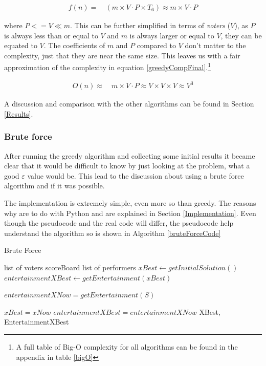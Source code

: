 \documentclass[12pt]{report}
\begin{document}
\begin{equation}\label{greedyCompSimp}
\begin{aligned}
	f(n) ={} & \ (m \times V \cdot P \times T_6) \approx m \times V \cdot P
\end{aligned}
\end{equation}

where $P <= V \ll m$. This can be further simplified in terms of \textit{voters} ($V$), as $P$ is always less than or equal to $V$ and $m$ is always larger or equal to $V$, they can be equated to $V$. The coefficients of $m$ and $P$ compared to $V$ don't matter to the complexity, just that they are near the same size. This leaves us with a fair approximation of the complexity in equation \ref{greedyCompFinal}.\footnote{A full table of Big-O complexity for all algorithms can be found in the appendix in table \ref{bigO}}

\begin{equation}\label{greedyCompFinal}
\begin{aligned}
	O(n) \approx{} & \ m \times V \cdot P \approx V \times V \times V \approx V^3
\end{aligned}
\end{equation}

A discussion and comparison with the other algorithms can be found in Section \ref{Results}.

\subsubsection{Brute force}
After running the greedy algorithm and collecting some initial results it became clear that it would be difficult to know by just looking at the problem, what a good $\varepsilon$ value would be. This lead to the discussion about using a brute force algorithm and if it was possible. 

The implementation is extremely simple, even more so than greedy. The reasons why are to do with Python and are explained in Section \ref{Implementation}. Even though the pseudocode and the real code will differ, the pseudocode help understand the algorithm so is shown in Algorithm \ref{bruteForceCode}

\begin{algorithm}
\caption{Brute Force}
\label{bruteForceCode}
\begin{algorithmic}[1]
\REQUIRE list of voters
\REQUIRE scoreBoard
\REQUIRE list of performers
\STATE $xBest \leftarrow getInitialSolution()$
\STATE $entertainmentXBest \leftarrow getEntertainment(xBest)$

\STATE $entertainmentXNow = getEntertainment(S)$

\STATE $xBest = xNow$
\STATE $entertainmentXBest = entertainmentXNow$
\ENDIF
\ENDFOR
\RETURN XBest, EntertainmentXBest
\end{algorithmic}
\end{algorithm}
\end{document}
